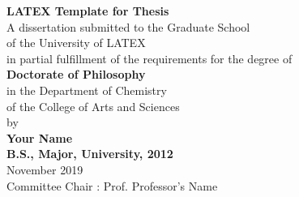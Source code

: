\begin{titlepage}
    \begin{center}
        \textbf{\Huge LATEX Template for Thesis}\\
        \vspace{1.0cm}
        \Large
        A dissertation submitted to the Graduate School\\
        of the University of LATEX \\
        in partial fulfillment of the requirements for the degree of \\
        \vspace{1.0cm}
        \textbf{Doctorate of Philosophy }\\
        \vspace{1.0cm}
        in the Department of Chemistry \\
        of the College of Arts and Sciences \\
        by \\
        \vspace{1.0cm}
        \textbf{Your Name} \\
        \vspace{1.0cm}
        \textbf{B.S., Major, University, 2012} \\
        \vspace{1.0cm}
        November 2019 \\
        \vspace{1.0cm}
        Committee Chair : Prof. Professor's Name
    \end{center}
\end{titlepage}

